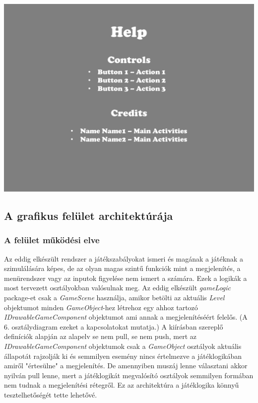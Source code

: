 \begin{center}
	\includegraphics[scale=0.5]{ScreenHelp.pdf}
	\newpage
	\end{center}
	
\subsection{A grafikus felület architektúrája}

\subsubsection{A felület működési elve}

Az eddig elkészült rendszer a játékszabályokat ismeri és magának a játéknak a szimulálására képes, de az olyan magas szintű funkciók mint a megjelenítés, a menürendszer vagy az inputok figyelése nem ismert a számára. Ezek a logikák a most tervezett osztályokban valósulnak meg. Az eddig elkészült \emph{gameLogic} package-et csak a \emph{GameScene} használja, amikor betölti az aktuális \emph{Level} objektumot minden \emph{GameObject}-hez létrehoz egy ahhoz tartozó \emph{IDrawableGameComponent} objektumot ami annak a megjelenítéséért felelős. (A 6. osztálydiagram ezeket a kapcsolatokat mutatja.) A kiírásban szereplő definíciók alapján az alapelv se nem pull, se nem push, mert az \emph{IDrawableGameComponent} objektumok csak a \emph{GameObject} osztályok aktuális állapotát rajzolják ki és semmilyen esemény nincs értelmezve a játéklogikában amiről "értesülne" a megjelenítés. De amennyiben muszáj lenne választani akkor nyilván pull lenne, mert a játéklogikát megvalósító osztályok semmilyen formában nem tudnak a megjelenítési rétegről. Ez az architektúra a játéklogika könnyű tesztelhetőségét tette lehetővé.

